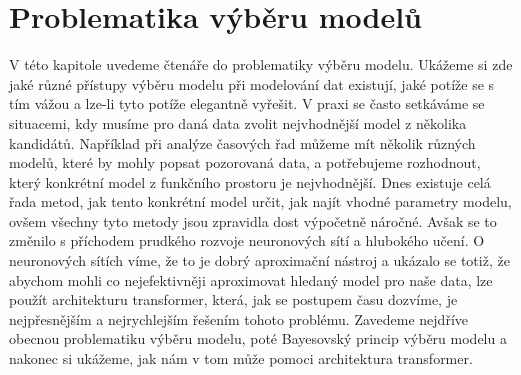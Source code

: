 \chapter{Problematika výběru modelů}
\label{chap:vyber-modelu}

V této kapitole uvedeme čtenáře do problematiky výběru modelu.
Ukážeme si zde jaké různé přístupy výběru modelu při modelování dat existují, jaké potíže se s tím vážou a lze-li tyto potíže elegantně vyřešit. 
V praxi se často setkáváme se situacemi, kdy musíme pro daná data zvolit nejvhodnější model z několika kandidátů.
Například při analýze časových řad můžeme mít několik různých modelů, které by mohly popsat pozorovaná data, a potřebujeme rozhodnout, který konkrétní model z funkčního prostoru je nejvhodnější.    
Dnes existuje celá řada metod, jak tento konkrétní model určit, jak najít vhodné parametry modelu, ovšem všechny tyto metody jsou zpravidla dost výpočetně náročné.
Avšak se to změnilo s příchodem prudkého rozvoje neuronových sítí a hlubokého učení.
O neuronových sítích víme, že to je dobrý aproximační nástroj a ukázalo se totiž, že abychom mohli co nejefektivněji aproximovat hledaný model pro naše data, lze použít architekturu transformer, která, jak se postupem času dozvíme, je nejpřesnějším a nejrychlejším řešením tohoto problému.
Zavedeme nejdříve obecnou problematiku výběru modelu, poté Bayesovský princip výběru modelu a nakonec si ukážeme, jak nám v tom může pomoci architektura transformer.

